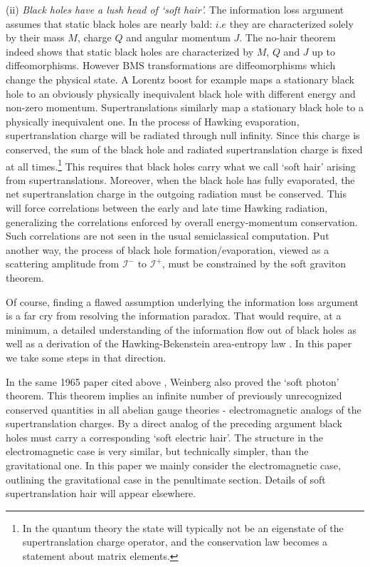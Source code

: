 \documentclass[12pt]{article}
\numberwithin{equation}{section}
\def\ci{{\mathcal I}}
\begin{document}
  \noindent(ii) {\it Black holes have a lush head  of `soft  hair'.} The information loss argument assumes that static black holes are nearly bald: $i.e$ they are characterized solely by their mass $M$, charge $Q$ and angular momentum $J$.  The no-hair theorem \cite{Chrusciel:2012jk} indeed shows that static black holes are characterized by $M$, $Q$ and $J$ up to diffeomorphisms. However BMS transformations are diffeomorphisms which change the physical state. A Lorentz boost for example maps a stationary black hole to an obviously physically inequivalent black hole with different energy and non-zero momentum.  Supertranslations similarly map a stationary black hole to a physically inequivalent one. In the process of Hawking evaporation, supertranslation charge will be radiated through null infinity. Since this charge is conserved, the sum of the black hole and radiated supertranslation charge is fixed at all times.\footnote{In the quantum theory the state will typically not be an eigenstate of the supertranslation charge operator, and the conservation law becomes a statement about matrix elements.} This requires that black holes carry what we call `soft hair' arising from supertranslations.  Moreover, when the black hole has fully evaporated, the net supertranslation charge in the outgoing radiation must be conserved. This will force correlations between the early and late time Hawking radiation, generalizing the correlations enforced by overall energy-momentum conservation. Such correlations are not seen in the usual semiclassical computation. Put another way, the process of black hole formation/evaporation, viewed as a scattering amplitude from $\ci^-$ to $\ci^+$, must be constrained by the soft graviton theorem. 
  
  Of course, finding a flawed assumption underlying the information loss argument  is a far cry from resolving the information paradox. That would require, at a minimum,  a detailed understanding of the information flow out of black holes as well as a derivation of the Hawking-Bekenstein area-entropy law \cite{Hawking:1974rv,Hawking:1974sw,Bekenstein:1973ur}. In this paper we take some steps in that direction.
      
In the same 1965 paper cited above \cite{Weinberg}, Weinberg also proved the `soft photon' theorem. This theorem implies \cite{Strominger:2013lka,He:2014cra,Campiglia:2015qka,Kapec:2015ena,Strominger:2015bla} 
an infinite number of previously unrecognized conserved quantities in all abelian gauge theories - electromagnetic analogs of the supertranslation charges.  By a direct analog of the preceding argument black holes must carry a corresponding `soft electric hair'. The structure in the electromagnetic case is very similar,
but technically simpler, than the gravitational one. In this paper we mainly consider the electromagnetic case,  outlining the gravitational case in the penultimate section. Details of soft supertranslation hair will appear elsewhere.
\end{document}
